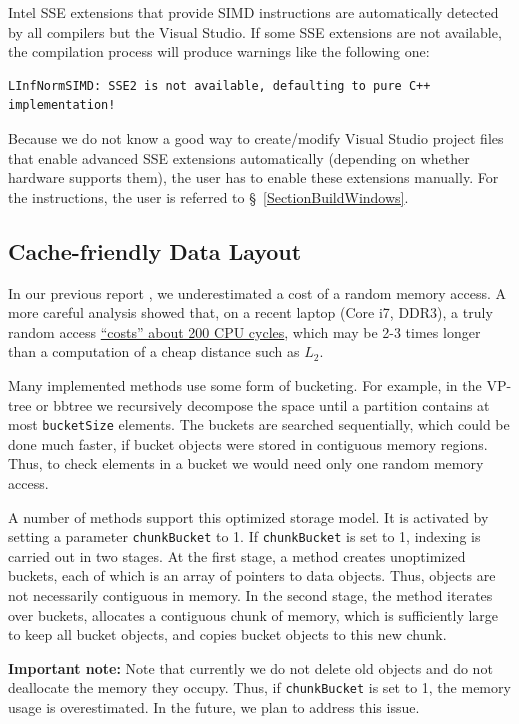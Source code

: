 \documentclass[runningheads,a4paper]{llncs}
\newcommand{\todonoteinline}[1]{\todo[color=red!40,inline,caption={TODO}]{#1}}
\newcommand{\ttt}[1]{\texttt{#1}}
\begin{document}
Intel SSE extensions that provide SIMD instructions are automatically detected
by all compilers but the Visual Studio.
If some SSE extensions are not available, the compilation process will produce warnings like the
following one:
{
\footnotesize
\begin{verbatim}
LInfNormSIMD: SSE2 is not available, defaulting to pure C++ implementation!
\end{verbatim}
}
Because we do not know a good way to create/modify Visual Studio project files 
that enable advanced SSE extensions automatically (depending on whether hardware supports them),
the user has to enable these extensions manually. 
For the instructions, the user is referred to \S~\ref{SectionBuildWindows}.

\subsection{Cache-friendly Data Layout}
In our previous report \cite{Boytsov_and_Bilegsaikhan:sisap2013},
we underestimated a cost of a random memory access.
A more careful analysis showed that, 
on a recent laptop (Core i7, DDR3), 
a truly random access \href{http://searchivarius.org/blog/main-memory-similar-hard-drive}{``costs'' about 200 CPU cycles},
which may be 2-3 times longer than a computation of a cheap distance such as $L_2$.

Many implemented methods use some form of bucketing.
For example, in the VP-tree or bbtree we recursively decompose the space
until a partition contains at most \ttt{bucketSize} elements.
The buckets are searched sequentially,
which could be done much faster, if bucket objects were stored
in contiguous memory regions.
Thus, to check elements in a bucket we would need only one random memory access.

A number of methods support this optimized storage model.
It is activated by setting a parameter \ttt{chunkBucket} to 1.
If \ttt{chunkBucket} is set to 1, indexing is carried out in two stages.
At the first stage, a method creates unoptimized buckets,
each of which is an array of pointers to data objects.
Thus, objects are not necessarily contiguous in memory.
In the second stage, the method iterates over buckets,
allocates a contiguous chunk of memory,
which is sufficiently large to keep all bucket objects,
and copies bucket objects to this new chunk.

\textbf{Important note:}
Note that currently we do not delete old objects and do not deallocate the memory 
they occupy. Thus, 
if 
\ttt{chunkBucket} is set to 1,
the memory usage is overestimated.
In the future, we plan to address this issue.
\end{document}
